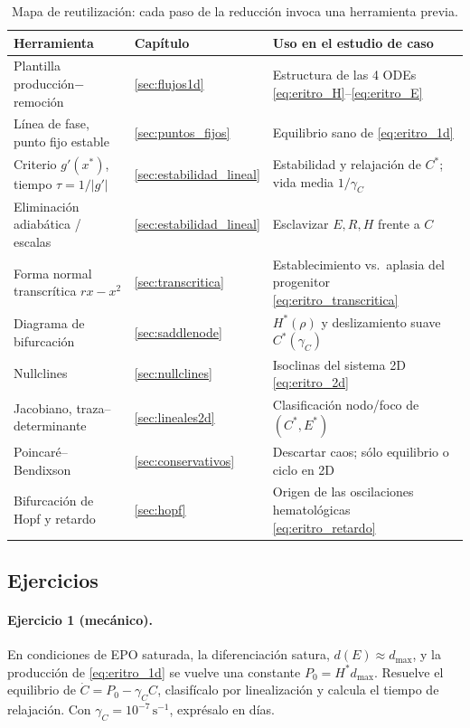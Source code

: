 \begin{table}[htbp]
\centering
\footnotesize
\caption{Mapa de reutilización: cada paso de la reducción invoca una herramienta previa.}
\label{tab:mapa_herramientas}
\begin{tabular}{lll}
\hline
Herramienta & Capítulo & Uso en el estudio de caso \\
\hline
Plantilla producción$-$remoción & \cref{sec:flujos1d} & Estructura de las 4 ODEs \eqref{eq:eritro_H}--\eqref{eq:eritro_E} \\
Línea de fase, punto fijo estable & \cref{sec:puntos_fijos} & Equilibrio sano de \eqref{eq:eritro_1d} \\
Criterio $g'(x^*)$, tiempo $\tau=1/|g'|$ & \cref{sec:estabilidad_lineal} & Estabilidad y relajación de $C^*$; vida media $1/\gamma_C$ \\
Eliminación adiabática / escalas & \cref{sec:estabilidad_lineal} & Esclavizar $E,R,H$ frente a $C$ \\
Forma normal transcrítica $rx-x^2$ & \cref{sec:transcritica} & Establecimiento vs.\ aplasia del progenitor \eqref{eq:eritro_transcritica} \\
Diagrama de bifurcación & \cref{sec:saddlenode} & $H^*(\rho)$ y deslizamiento suave $C^*(\gamma_C)$ \\
Nullclines & \cref{sec:nullclines} & Isoclinas del sistema 2D \eqref{eq:eritro_2d} \\
Jacobiano, traza--determinante & \cref{sec:lineales2d} & Clasificación nodo/foco de $(C^*,E^*)$ \\
Poincaré--Bendixson & \cref{sec:conservativos} & Descartar caos; sólo equilibrio o ciclo en 2D \\
Bifurcación de Hopf y retardo & \cref{sec:hopf} & Origen de las oscilaciones hematológicas \eqref{eq:eritro_retardo} \\
\hline
\end{tabular}
\end{table}

\subsection{Ejercicios}

\paragraph{Ejercicio 1 (mecánico).} En condiciones de EPO saturada, la diferenciación satura, $d(E)\approx d_{\max}$, y la producción de \eqref{eq:eritro_1d} se vuelve una constante $P_0 = H^* d_{\max}$. Resuelve el equilibrio de $\dot C = P_0 - \gamma_C C$, clasifícalo por linealización y calcula el tiempo de relajación. Con $\gamma_C = 10^{-7}\,\mathrm{s}^{-1}$, exprésalo en días.

